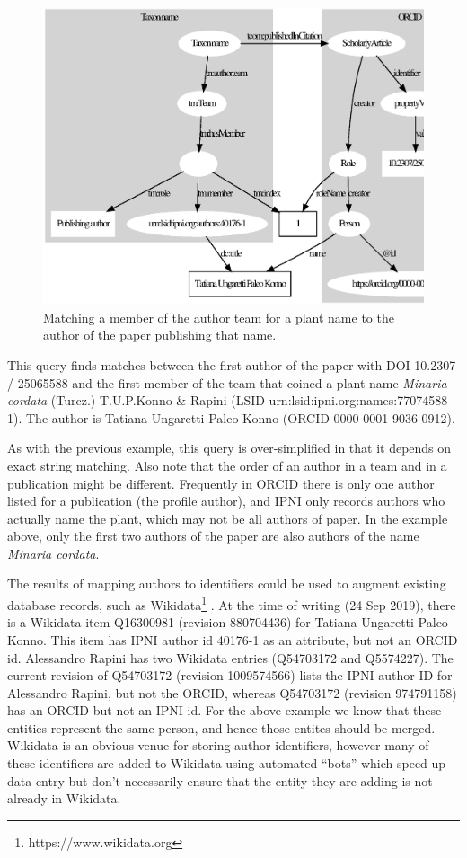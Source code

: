 \documentclass[runningheads]{llncs}
\begin{document}
\begin{figure}
\includegraphics[width=\textwidth]{ipni.eps}
\caption{Matching a member of the author team for a plant name to the author of the paper publishing that name.} \label{figipni}
\end{figure}

This query finds matches between the first author of the paper with DOI 10.2307 / 25065588 \cite{konno_new_2006} and the first member of the team that coined a plant name  \textit{Minaria cordata} (Turcz.) T.U.P.Konno \& Rapini (LSID urn:lsid:ipni.org:names:77074588-1). The author is Tatiana Ungaretti Paleo Konno (ORCID 0000-0001-9036-0912).

As with the previous example, this query is over-simplified in that it depends on exact string matching. Also note that the order of an author in a team and in a publication might be different. Frequently in ORCID there is only one author listed for a publication (the profile author), and IPNI only records authors who actually name the plant, which may not be all authors of paper. In the example above, only the first two authors of the paper are also authors of the name \textit{Minaria cordata}.

The results of mapping authors to identifiers could be used to augment existing database records, such as Wikidata\footnote{https://www.wikidata.org} \cite{vrandecic_wikidata_2014}. At the time of writing (24 Sep 2019), there is a Wikidata item Q16300981 (revision 880704436) for Tatiana Ungaretti Paleo Konno. This item has IPNI author id 40176-1 as an attribute, but not an ORCID id. Alessandro Rapini has two Wikidata entries (Q54703172 and Q5574227). The current revision of Q54703172 (revision 1009574566) lists the IPNI author ID for Alessandro Rapini, but not the ORCID, whereas Q54703172 (revision 974791158) has an ORCID but not an IPNI id. For the above example we know that these entities represent the same person, and hence those entites should be merged. Wikidata is an obvious venue for storing author identifiers, however many of these identifiers are added to Wikidata using automated “bots” which speed up data entry but don’t necessarily ensure that the entity they are adding is not already in Wikidata.
\end{document}
